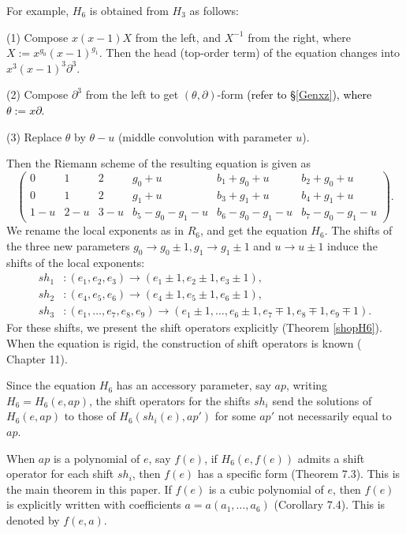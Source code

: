 \documentclass[a4paper,12pt]{article}
\theoremstyle{definition}
\theoremstyle{remark}
\numberwithin{equation}{section} %
\newcommand{\blue}[1]{\textcolor{black}{#1}}
\begin{document}
   For example, $H_6$ is obtained from $H_3$ as follows: \par\smallskip\noindent(1) Compose $x(x-1)X$ from the left, and $X^{-1}$ from the right, where $X:=x^{g_0}(x-1)^{g_1}$. Then the head (top-order term) of the equation changes into $x^3(x-1)^3\partial^3$. \par\smallskip\noindent(2) Compose $\partial^3$ from the left to get $(\theta,\partial)$-form \blue{(refer to \S \ref{Genxz}), where $\theta:=x\partial$.} \par\smallskip\noindent(3) Replace $\theta$ by $\theta-u$ (middle convolution with parameter $u$). \par\smallskip\noindent
   Then the Riemann scheme of the resulting  equation is given as
$$ \left( \begin{array}{cccccc}
   0&1&2&g_0+u&b_1+g_0+u&b_2+g_0+u\\
   0&1&2&g_1+u&b_3+g_1+u&b_4+g_1+u\\
   1-u&2-u&3-u&b_5-g_0-g_1-u&b_6-g_0-g_1-u&b_7-g_0-g_1-u
     \end{array}\right).$$
We rename the local exponents as in $R_6$, and get the equation $H_6$.
The shifts of the three new parameters $g_0\to g_0\pm1,g_1\to g_1\pm1$ and $u\to u\pm1$
induce the shifts of the local exponents:
$$
 \begin{aligned}
  sh_1&:(e_1,e_2,e_3)\to(e_1\pm1,e_2\pm1,e_3\pm1),\\ 
  sh_2&:(e_4,e_5,e_6)\to(e_4\pm1,e_5\pm1,e_6\pm1),\\
  sh_3&:(e_1,\dots,e_7,e_8,e_9)\to
  (e_1\pm1,\dots,e_6\pm1,e_7\mp1,e_8\mp1,e_9\mp1).
 \end{aligned}
$$
For these shifts, we present the shift operators explicitly (Theorem \ref{shopH6}). 
When the equation is rigid, the construction of shift operators is known (\cite{Osh} Chapter 11).
 \par\medskip
   Since the equation $H_6$ has an accessory parameter, say $ap$, writing $H_6=H_6(e,ap)$, the shift operators for the shifts $sh_i$ send the solutions of $H_6(e,ap)$ to those of $H_6(sh_i(e),ap')$ for some $ap'$ not necessarily equal to $ap$.
   \par\medskip   
When $ap$ is a polynomial of $e$, say $f(e)$, if $H_6(e,f(e))$ admits a shift operator for each shift $sh_i$, then $f(e)$ has a specific form (Theorem 7.3). This is the main theorem in this paper. If $f(e)$ is a cubic polynomial of $e$, then $f(e)$ is explicitly written with coefficients $a=a(a_1,\dots,a_6)$ (Corollary 7.4). This is denoted by $f(e,a)$. 
\end{document}
